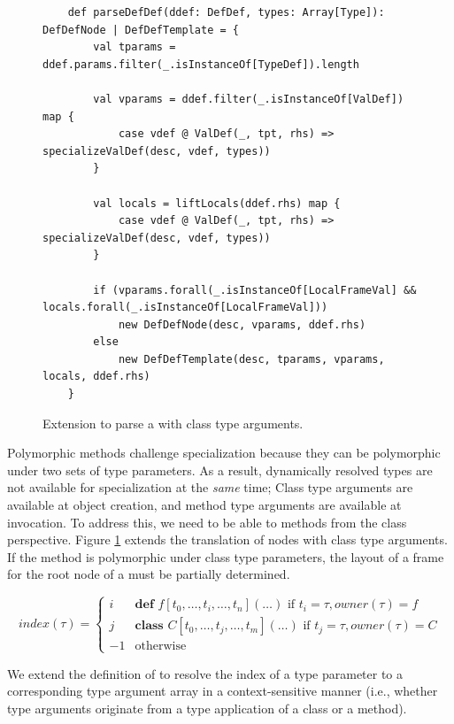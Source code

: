 \begin{figure}[!htb]
	\begin{verbatim}
	def parseDefDef(ddef: DefDef, types: Array[Type]): DefDefNode | DefDefTemplate = {
		val tparams = ddef.params.filter(_.isInstanceOf[TypeDef]).length
		
		val vparams = ddef.filter(_.isInstanceOf[ValDef]) map {
			case vdef @ ValDef(_, tpt, rhs) => specializeValDef(desc, vdef, types))
		}
	
		val locals = liftLocals(ddef.rhs) map {
			case vdef @ ValDef(_, tpt, rhs) => specializeValDef(desc, vdef, types))
		}
	
		if (vparams.forall(_.isInstanceOf[LocalFrameVal] && locals.forall(_.isInstanceOf[LocalFrameVal]))
			new DefDefNode(desc, vparams, ddef.rhs)
		else 
			new DefDefTemplate(desc, tparams, vparams, locals, ddef.rhs)
	}
	\end{verbatim}
	\caption{Extension to parse a  with class type arguments.}
	\label{impl:parse-poly-defdef-cls}
\end{figure}

Polymorphic methods challenge specialization because they can be polymorphic under two sets of type parameters.
As a result, dynamically resolved types are not available for specialization at the \textit{same} time; Class type arguments are available at object creation, and method type arguments are available at invocation.
To address this, we need to be able to  methods from the class perspective.
Figure \ref{impl:parse-poly-defdef-cls} extends the translation of  nodes with class type arguments.
If the method is polymorphic under class type parameters, the layout of a frame for the root node of a  must be partially determined.

$$
index(\tau) = 
\begin{cases}
	i  & \textbf{def } f[t_0, \ldots, t_i, \ldots, t_n](\ldots) \text{ if } t_i = \tau, owner(\tau)=f \\
	j  & \textbf{class } C[t_0, \ldots, t_j, \ldots, t_m](\ldots) \text{ if } t_j = \tau, owner(\tau)=C \\
	-1 & \text{otherwise}
\end{cases}
$$

We extend the definition of  to resolve the index of a type parameter to a corresponding type argument array in a context-sensitive manner (i.e., whether type arguments originate from a type application of a class or a method).

